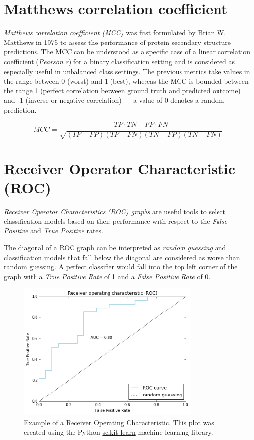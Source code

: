 \documentclass{article}
\begin{document}
\section{Matthews correlation coefficient}

\emph{Matthews correlation coefficient (MCC)} was first formulated by Brian W. Matthews \cite{matthews1975comparison} in 1975 to assess the performance of protein secondary structure predictions. The MCC can be understood as a specific case of a linear correlation coefficient (\emph{Pearson r}) for a binary classification setting and is considered as especially useful in unbalanced class settings.
The previous metrics take values in the range between 0 (worst) and 1 (best), whereas the MCC is bounded between the range 1 (perfect correlation between ground truth and predicted outcome) and -1 (inverse or negative correlation) --- a value of 0 denotes a random prediction.

\begin{equation} MCC = \frac{ TP \cdot TN - FP \cdot FN } {\sqrt{ (TP + FP) ( TP + FN ) ( TN + FP ) ( TN + FN ) } } \end{equation}



\section{Receiver Operator Characteristic (ROC)}

\emph{Receiver Operator Characteristics (ROC) graphs} are useful tools to select classification models based on their performance with respect to the \emph{False Positive} and \emph{True Positive} rates.


The diagonal of a ROC graph can be interpreted as \emph{random guessing} and classification models that fall below the diagonal are considered as worse than random guessing. A perfect classifier would fall into the top left corner of the graph with a \emph{True Positive Rate} of 1 and a  \emph{False Positive Rate} of 0.

\begin{figure}[h!]
    \centering
    \includegraphics[width=0.8\textwidth]{./plot/roc.png}
    \caption{Example of a Receiver Operating Characteristic. This plot was created using the Python \href{http://scikit-learn.org/stable/auto_examples/plot_roc.html}{scikit-learn} machine learning library.}

\end{figure}
\end{document}
